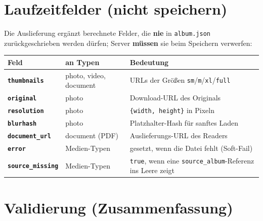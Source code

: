 \documentclass[11pt,a4paper]{article}
\let\mpdtt\texttt
\renewcommand{\texttt}[1]{\mpdtt{\textcolor{mpdred}{#1}}}
\newcommand{\feld}[1]{\mpdtt{\textbf{\textcolor{mpdred}{#1}}}}
\newcommand{\kopf}[1]{\textbf{#1}}
\begin{document}
\section{Laufzeitfelder (nicht speichern)}

Die Auslieferung ergänzt berechnete Felder, die \textbf{nie} in
\texttt{album.json} zurückgeschrieben werden dürfen; Server
\textbf{müssen} sie beim Speichern verwerfen:

\begin{tabularx}{\linewidth}{|l|l|L|}
\hline
{}\kopf{Feld} & \kopf{an Typen} & \kopf{Bedeutung} \\
\hline
\feld{thumbnails} & photo, video, document & URLs der Größen \texttt{sm}/\texttt{m}/\texttt{xl}/\texttt{full} \\
\feld{original} & photo & Download-URL des Originals \\
\feld{resolution} & photo & \texttt{\{width, height\}} in Pixeln \\
\feld{blurhash} & photo & Platzhalter-Hash für sanftes Laden \\
\feld{document\_url} & document (PDF) & Auslieferungs-URL des Readers \\
\feld{error} & Medien-Typen & gesetzt, wenn die Datei fehlt (Soft-Fail) \\
\feld{source\_missing} & Medien-Typen & \texttt{true}, wenn eine \texttt{source\_album}-Referenz ins Leere zeigt \\
\hline
\end{tabularx}

\section{Validierung (Zusammenfassung)}
\end{document}
